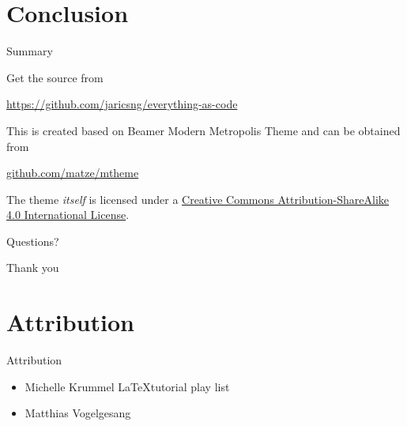 \documentclass{beamer}
\begin{document}



\section{Conclusion}

\begin{frame}{Summary}

  Get the source from 

  \begin{center}
    \url{https://github.com/jaricsng/everything-as-code}
  \end{center}

  This is created based on Beamer Modern Metropolis Theme and can be obtained from 

  \begin{center}\url{github.com/matze/mtheme}\end{center}

  The theme \emph{itself} is licensed under a
  \href{http://creativecommons.org/licenses/by-sa/4.0/}{Creative Commons
  Attribution-ShareAlike 4.0 International License}.

  \begin{center}\ccbysa\end{center}

\end{frame}

{
\begin{frame}[standout]
  Questions?
\end{frame}
}

{
\begin{frame}[standout]
  Thank you
\end{frame}
}

\section{Attribution}
\begin{frame}{Attribution}
  \begin{itemize}
    \item Michelle Krummel \LaTeX tutorial play list 
    \href{https://www.youtube.com/watch?v=0fsWGg81RwU&list=PL1D4EAB31D3EBC449&index=15}{}
    \item Matthias Vogelgesang \tiny\href{https://github.com/matze/mtheme}{}
  \end{itemize}    
\end{frame}
\end{document}

